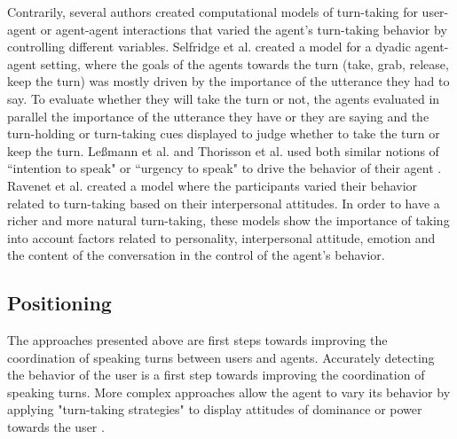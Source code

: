Contrarily, several authors created computational models of
turn-taking for user-agent or agent-agent interactions
that varied the agent's turn-taking behavior by controlling 
different variables. 
Selfridge et al. \citep{selfridge_bidding_2009} created a model for a dyadic
agent-agent setting, where the goals of the agents towards the turn (take, grab, release, keep the turn) was mostly driven by the importance
of the utterance they had to say. To evaluate whether they
will take the turn or not, the agents evaluated in parallel
the importance of the utterance they have or they are saying
and the turn-holding or turn-taking cues displayed to
judge whether to take the turn or keep the turn. Le{\ss}mann et al. \citep{lessmann_towards_2004} and Thorisson et al. \citep{thorisson_multiparty_2010}
used both similar notions of ``intention to speak" \citep{lessmann_towards_2004} or
``urgency to speak" to drive the behavior of their agent
\citep{thorisson_multiparty_2010}. Ravenet et al. \citep{ravenet_conversational_2015} created a model where the participants varied
their behavior related to turn-taking based on their interpersonal
attitudes. In order to have a richer and more
natural turn-taking, these models show the importance
of taking into account factors related to personality,
interpersonal attitude, emotion and the content of the
conversation in the control of the agent's behavior. 

\subsection{Positioning}

The approaches presented above are first steps towards improving the coordination of speaking turns between users and agents. Accurately detecting the behavior of the user is a first step towards improving the coordination of speaking turns. More complex approaches allow the agent to vary its behavior by applying "turn-taking strategies" \citep{ter_maat_how_2010} to display attitudes of dominance or power towards the user \citep{ravenet_conversational_2015,cafaro_effects_2016}. %

